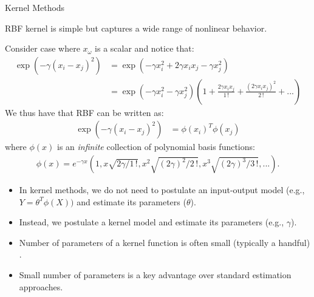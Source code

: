 \documentclass[9pt]{beamer}
\begin{document}
\begin{frame}{Kernel Methods}

RBF kernel is simple but captures a wide range of nonlinear behavior. 
\begin{block}{}
Consider case where $x_\omega$ is a scalar and notice that:
\begin{align*}
\exp(-\gamma(x_i-x_j)^2)&=\exp(-\gamma x_i^2+2\gamma x_ix_j-\gamma x_j^2)\\
&=\exp(-\gamma x_i^2-\gamma x_j^2)\left(1+\frac{2\gamma x_ix_j}{1\, !}+\frac{(2\gamma x_ix_j)^2}{2\,!}+...\right)
\end{align*}
We thus have that RBF can be written as:
\begin{align*}
\exp(-\gamma(x_i-x_j)^2)&=\phi(x_i)^T\phi(x_j)
\end{align*}
where $\phi(x)$ is an {\em infinite} collection of polynomial basis functions: 
\begin{align*}
\phi(x)=e^{-\gamma x}(1,x\sqrt{2\gamma/1\,!},x^2\sqrt{(2\gamma)^2/2\,!},x^3\sqrt{(2\gamma)^3/3\,!},...). 
\end{align*}
\end{block}
\begin{itemize}
\item In kernel methods, we do not need to postulate an input-output model (e.g., $Y=\theta^T\phi(X))$ and estimate its parameters ($\theta$).  
\item Instead, we postulate a kernel model and estimate its parameters (e.g., $\gamma$).  
\item Number of parameters of a kernel function is often small (typically a handful) . 
\item Small number of parameters is a key advantage over standard estimation approaches. 
\end{itemize}


\end{frame}
\end{document}
